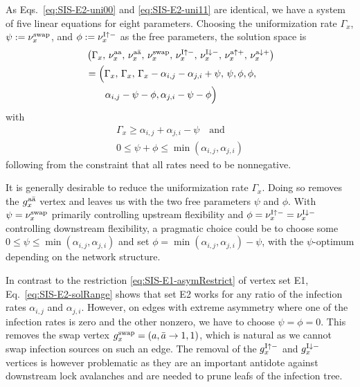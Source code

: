 \documentclass[english,10pt,aps,pra,twocolumn,superscriptaddress,floatfix,fleqn]{revtex4-2}
\newcommand{\tI}{\textnormal{I}}
\newcommand{\ta}{\textnormal{a}}
\newcommand{\bta}{\bar{\textnormal{a}}}
\newcommand{\taa}{\textnormal{aa}}
\newcommand{\swap}{\textnormal{swap}}
\let\up\uparrow
\let\dw\downarrow
\begin{document}
As Eqs.~\eqref{eq:SIS-E2-uni00} and \eqref{eq:SIS-E2-uni11} are identical, we have a system of five linear equations for eight parameters. Choosing the uniformization rate $\Gamma_x$, $\psi:=\nu^\swap_x$, and $\phi:=\nu^{\tI\up-}_x$ as the free parameters, the solution space is
\begin{align}\nonumber
	&\left(\Gamma_x,\, \nu^\taa_x,\, \nu^{\ta\bta}_x,\, \nu^\swap_x,\, \nu^{\tI\up-}_x,\, \nu^{\tI\dw-}_x,\, \nu^{\ta\up+}_x,\, \nu^{\ta\dw+}_x\right)\\
	&\textstyle \nonumber
	=\Big(\Gamma_x,\, \Gamma_x,\, \Gamma_x-\alpha_{i,j}-\alpha_{j,i} + \psi,\, \psi, \phi, \phi,\\
	& \qquad \alpha_{i,j}-\psi-\phi, \alpha_{j,i}-\psi-\phi \Big)
	\label{eq:SIS-E2-sol}
\end{align}
with
\begin{subequations}\label{eq:SIS-E2-solRange}
\begin{gather}
	\Gamma_x \geq \alpha_{i,j} + \alpha_{j,i} - \psi\quad\text{and}\\
	0 \leq \psi + \phi \leq \min(\alpha_{i,j}, \alpha_{j,i})
\end{gather}
\end{subequations}
following from the constraint that all rates need to be nonnegative.

It is generally desirable to reduce the uniformization rate $\Gamma_x$. Doing so removes the $g^{\ta\bta}_x$ vertex and leaves us with the two free parameters $\psi$ and $\phi$. With $\psi=\nu^\swap_x$ primarily controlling upstream flexibility and $\phi=\nu^{\tI\up-}_x=\nu^{\tI\dw-}_x$ controlling downstream flexibility, a pragmatic choice could be to choose some $0\leq\psi\leq\min(\alpha_{i,j}, \alpha_{j,i})$ and set $\phi=\min(\alpha_{i,j}, \alpha_{j,i})-\psi$, with the $\psi$-optimum depending on the network structure.

In contrast to the restriction \eqref{eq:SIS-E1-asymRestrict} of vertex set \textsc{E1}, Eq.~\eqref{eq:SIS-E2-solRange} shows that set \textsc{E2} works for any ratio of the infection rates $\alpha_{i,j}$ and $\alpha_{j,i}$. However, on edges with extreme asymmetry where one of the infection rates is zero and the other nonzero, we have to choose $\psi=\phi=0$. This removes the swap vertex $g^\swap_x=(a,\bar{a}\to 1,1)$, which is natural as we cannot swap infection sources on such an edge. The removal of the $g^{\tI\up-}_x$ and $g^{\tI\dw-}_x$ vertices is however problematic as they are an important antidote against downstream lock avalanches and are needed to prune leafs of the infection tree.
\end{document}
